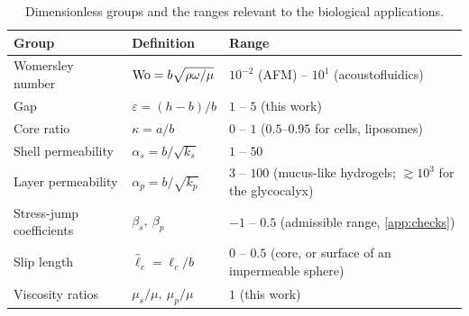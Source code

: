 \begin{table}[t]
\caption{Dimensionless groups and the ranges relevant to the biological applications.}
\label{tab:groups}
\begin{ruledtabular}
\begin{tabular}{lll}
Group & Definition & Range \\
\hline
Womersley number & $\mathrm{Wo}=b\sqrt{\rho\omega/\mu}$ & $10^{-2}$ (AFM) -- $10^{1}$ (acoustofluidics)\\
Gap & $\varepsilon=(h-b)/b$ & $1$ -- $5$ (this work)\\
Core ratio & $\kappa=a/b$ & $0$ -- $1$ ($0.5$--$0.95$ for cells, liposomes)\\
Shell permeability & $\alpha_s=b/\sqrt{k_s}$ & $1$ -- $50$\\
Layer permeability & $\alpha_p=b/\sqrt{k_p}$ & $3$ -- $100$ (mucus-like hydrogels; $\gtrsim10^3$ for the glycocalyx)\\
Stress-jump coefficients & $\beta_s,\ \beta_p$ & $-1$ -- $0.5$ (admissible range, \cref{app:checks})\\
Slip length & $\hat\ell_c=\ell_c/b$ & $0$ -- $0.5$ (core, or surface of an impermeable sphere)\\
Viscosity ratios & $\mu_s/\mu,\ \mu_p/\mu$ & $1$ (this work)\\
\end{tabular}
\end{ruledtabular}
\end{table}

